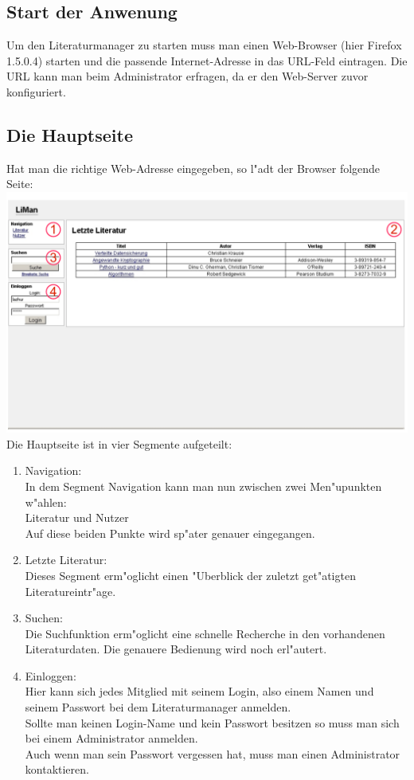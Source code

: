 \subsection{Start der Anwenung}
Um den Literaturmanager zu starten muss man einen Web-Browser (hier Firefox 1.5.0.4) starten und die passende Internet-Adresse in das URL-Feld eintragen. Die URL kann man beim Administrator erfragen, da er den Web-Server zuvor konfiguriert.
\subsection{Die Hauptseite}
Hat man die richtige Web-Adresse eingegeben, so l"adt der Browser folgende Seite:\\
\includegraphics[scale=0.8]{screen1}\\
Die Hauptseite ist in vier Segmente aufgeteilt:\\
\begin{enumerate}
\item Navigation:\\
In dem Segment Navigation kann man nun zwischen zwei Men"upunkten w"ahlen:\\
Literatur und Nutzer\\
Auf diese beiden Punkte wird sp"ater genauer eingegangen.
\item Letzte Literatur:\\
Dieses Segment erm"oglicht einen "Uberblick der zuletzt get"atigten Literatureintr"age.
\item Suchen:\\
Die Suchfunktion erm"oglicht eine schnelle Recherche in den vorhandenen Literaturdaten. Die genauere Bedienung wird noch erl"autert.
\item Einloggen:\\
Hier kann sich jedes Mitglied mit seinem Login, also einem Namen und seinem Passwort bei dem Literaturmanager anmelden.\\
Sollte man keinen Login-Name und kein Passwort besitzen so muss man sich bei einem Administrator anmelden.\\
Auch wenn man sein Passwort vergessen hat, muss man einen Administrator kontaktieren.\\
\end{enumerate}
